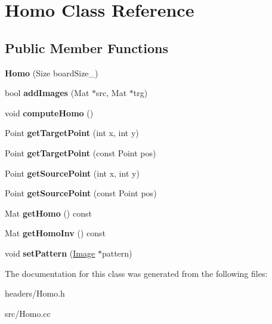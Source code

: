 \hypertarget{class_homo}{\section{Homo Class Reference}
\label{class_homo}
}
\subsection*{Public Member Functions}
\begin{DoxyCompactItemize}
\item 
\hypertarget{class_homo_a76176c64001e0a7f3c51878ea0e343cc}{{\bfseries Homo} (Size board\-Size\-\_\-)}\label{class_homo_a76176c64001e0a7f3c51878ea0e343cc}

\item 
\hypertarget{class_homo_a5412617c15ec4b68ab31c109d1b2d6b2}{bool {\bfseries add\-Images} (Mat $\ast$src, Mat $\ast$trg)}\label{class_homo_a5412617c15ec4b68ab31c109d1b2d6b2}

\item 
\hypertarget{class_homo_a65119d961a8cc3541699178fc664107a}{void {\bfseries compute\-Homo} ()}\label{class_homo_a65119d961a8cc3541699178fc664107a}

\item 
\hypertarget{class_homo_af8f500747fd887d4692b77acba76c6ca}{Point {\bfseries get\-Target\-Point} (int x, int y)}\label{class_homo_af8f500747fd887d4692b77acba76c6ca}

\item 
\hypertarget{class_homo_a18f0551bcd55d63537ece501359cd446}{Point {\bfseries get\-Target\-Point} (const Point pos)}\label{class_homo_a18f0551bcd55d63537ece501359cd446}

\item 
\hypertarget{class_homo_a10f5de8c9a2aa431c6163f827e9e8afc}{Point {\bfseries get\-Source\-Point} (int x, int y)}\label{class_homo_a10f5de8c9a2aa431c6163f827e9e8afc}

\item 
\hypertarget{class_homo_a5114c847e911ee46fe8fe6f756801552}{Point {\bfseries get\-Source\-Point} (const Point pos)}\label{class_homo_a5114c847e911ee46fe8fe6f756801552}

\item 
\hypertarget{class_homo_ac613f239b006de5c5e858946ff662438}{Mat {\bfseries get\-Homo} () const }\label{class_homo_ac613f239b006de5c5e858946ff662438}

\item 
\hypertarget{class_homo_af26f925be5708e0c22aaccd9d9ecadd4}{Mat {\bfseries get\-Homo\-Inv} () const }\label{class_homo_af26f925be5708e0c22aaccd9d9ecadd4}

\item 
\hypertarget{class_homo_aaf9f8de23b9cd624c4f9ac49df6155fc}{void {\bfseries set\-Pattern} (\hyperlink{class_image}{Image} $\ast$pattern)}\label{class_homo_aaf9f8de23b9cd624c4f9ac49df6155fc}

\end{DoxyCompactItemize}


The documentation for this class was generated from the following files\-:\begin{DoxyCompactItemize}
\item 
headers/Homo.\-h\item 
src/Homo.\-cc\end{DoxyCompactItemize}
